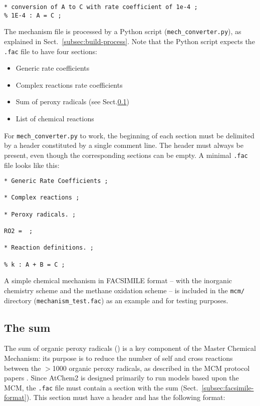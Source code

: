\begin{verbatim}
* conversion of A to C with rate coefficient of 1e-4 ;
% 1E-4 : A = C ;
\end{verbatim}

The mechanism file is processed by a Python script (\texttt{mech\_converter.py}),
as explained in Sect.~\ref{subsec:build-process}. Note that the Python script
expects the \texttt{.fac} file to have four sections:

\begin{itemize}
\item Generic rate coefficients
\item Complex reactions rate coefficients
\item Sum of peroxy radicals (see Sect.\ref{subsec:ro2-sum})
\item List of chemical reactions
\end{itemize}

For \texttt{mech\_converter.py} to work, the beginning of each section
must be delimited by a header constituted by a single comment line.
The header must always be present, even though the corresponding
sections can be empty. A minimal \texttt{.fac} file looks like this:

\begin{verbatim}
* Generic Rate Coefficients ;

* Complex reactions ;

* Peroxy radicals. ;

RO2 =  ;

* Reaction definitions. ;

% k : A + B = C ;
\end{verbatim}

A simple chemical mechanism in FACSIMILE format -- with the inorganic
chemistry scheme and the methane oxidation scheme -- is included in
the \texttt{mcm/} directory (\texttt{mechanism\_test.fac}) as an
example and for testing purposes.

\subsection{The  sum} \label{subsec:ro2-sum}

The sum of organic peroxy radicals () is a key component of
the Master Chemical Mechanism: its purpose is to reduce the number of
self and cross reactions between the $>$1000 organic peroxy radicals,
as described in the MCM protocol papers \citep{Jenkin_1997,
  Saunders_2003}. Since AtChem2 is designed primarily to run models
based upon the MCM, the \texttt{.fac} file must contain a section with
the  sum (Sect.~\ref{subsec:facsimile-format}). This section
must have a header and has the following format:

